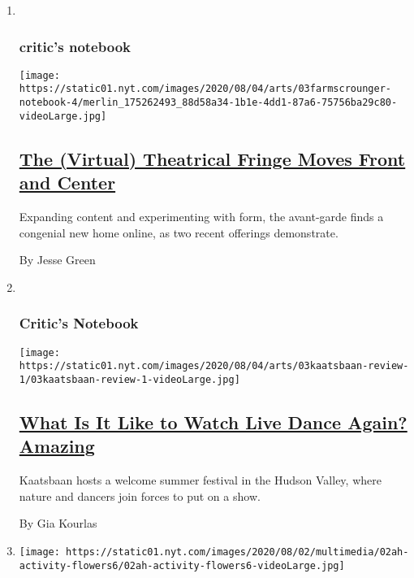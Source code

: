 \begin{enumerate}
\def\labelenumi{\arabic{enumi}.}
\item ~
  \hypertarget{critics-notebook}{%
  \subsubsection{critic's notebook}\label{critics-notebook}}

  \texttt{[image: https://static01.nyt.com/images/2020/08/04/arts/03farmscrounger-notebook-4/merlin\_175262493\_88d58a34-1b1e-4dd1-87a6-75756ba29c80-videoLarge.jpg]}

  \hypertarget{the-virtual-theatrical-fringe-moves-front-and-center}{%
  \subsection{\texorpdfstring{\href{/2020/08/03/theater/virtual-theater.html}{The
  (Virtual) Theatrical Fringe Moves Front and
  Center}}{The (Virtual) Theatrical Fringe Moves Front and Center}}\label{the-virtual-theatrical-fringe-moves-front-and-center}}

  Expanding content and experimenting with form, the avant-garde finds a
  congenial new home online, as two recent offerings demonstrate.

  By Jesse Green
\item ~
  \hypertarget{critics-notebook-1}{%
  \subsubsection{Critic's Notebook}\label{critics-notebook-1}}

  \texttt{[image: https://static01.nyt.com/images/2020/08/04/arts/03kaatsbaan-review-1/03kaatsbaan-review-1-videoLarge.jpg]}

  \hypertarget{what-is-it-like-to-watch-live-dance-again-amazing}{%
  \subsection{\texorpdfstring{\href{/2020/08/03/arts/dance/kaatsbaan-dance.html}{What
  Is It Like to Watch Live Dance Again?
  Amazing}}{What Is It Like to Watch Live Dance Again? Amazing}}\label{what-is-it-like-to-watch-live-dance-again-amazing}}

  Kaatsbaan hosts a welcome summer festival in the Hudson Valley, where
  nature and dancers join forces to put on a show.

  By Gia Kourlas
\item
  \texttt{[image: https://static01.nyt.com/images/2020/08/02/multimedia/02ah-activity-flowers6/02ah-activity-flowers6-videoLarge.jpg]}


\end{enumerate}
